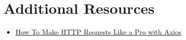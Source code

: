 


\section{Additional Resources}

\begin{itemize}[leftmargin=*]
    \item \href{https://blog.logrocket.com/how-to-make-http-requests-like-a-pro-with-axios/}{How To Make HTTP Requests Like a Pro with Axios}
\end{itemize}
